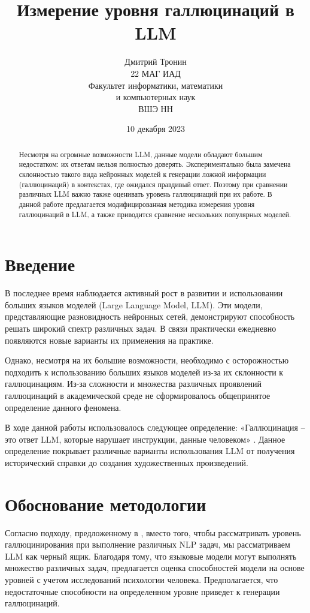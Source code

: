 \documentclass{article}
\title{Измерение уровня галлюцинаций в LLM}
\date{10 декабря 2023}
\author{{Дмитрий Тронин} \\
	22 МАГ ИАД\\
	Факультет информатики, математики \\ и компьютерных наук \\
	ВШЭ НН
}
\begin{document}
\maketitle

\begin{abstract}
    Несмотря на огромные возможности LLM, данные модели обладают большим недостатком: их ответам нельзя полностью доверять. Экспериментально была замечена склонностью такого вида нейронных моделей к генерации ложной информации (галлюцинаций) в контекстах, где ожидался правдивый ответ. Поэтому при сравнении различных LLM важно также оценивать уровень галлюцинаций при их работе. В данной работе предлагается модифицированная методика измерения уровня галлюцинаций в LLM, а также приводится сравнение нескольких популярных моделей.
\end{abstract}



\section{Введение}
В последнее время наблюдается активный рост в развитии и использовании больших языков моделей (Large Language Model, LLM). Эти модели, представляющие разновидность нейронных сетей, демонстрируют способность решать широкий спектр различных задач. В связи практически ежедневно появляются новые варианты их применения на практике.

Однако, несмотря на их большие возможности, необходимо с осторожностью подходить к использованию больших языков моделей из-за их склонности к галлюцинациям. Из-за сложности и множества различных проявлений галлюцинаций в академической среде не сформировалось общепринятое определение данного феномена.

В ходе данной работы использовалось следующее определение: «Галлюцинация – это ответ LLM, которые нарушает инструкции, данные человеком»  \cite{du2023quantifying}. Данное определение покрывает различные варианты использования LLM от получения исторический справки до создания художественных произведений.


\section{Обоснование методологии}
Согласно подходу, предложенному в \cite{du2023quantifying}, вместо того, чтобы рассматривать уровень галлюцинирования при выполнение различных NLP задач, мы рассматриваем LLM как черный ящик. Благодаря тому, что языковые модели могут выполнять множество различных задач, предлагается оценка способностей модели на основе уровней с учетом исследований психологии человека. Предполагается, что недостаточные способности на определенном уровне приведет к генерации галлюцинаций.
\end{document}

